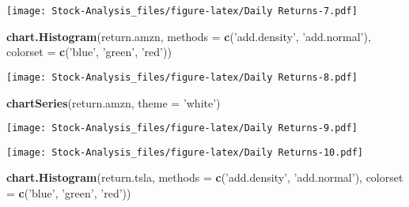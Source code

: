 \documentclass[
]{article}
\newenvironment{Shaded}{\begin{snugshade}}{\end{snugshade}}
\newcommand{\CommentTok}[1]{\textcolor[rgb]{0.56,0.35,0.01}{\textit{#1}}}
\newcommand{\DataTypeTok}[1]{\textcolor[rgb]{0.13,0.29,0.53}{#1}}
\newcommand{\DecValTok}[1]{\textcolor[rgb]{0.00,0.00,0.81}{#1}}
\newcommand{\KeywordTok}[1]{\textcolor[rgb]{0.13,0.29,0.53}{\textbf{#1}}}
\newcommand{\NormalTok}[1]{#1}
\newcommand{\OperatorTok}[1]{\textcolor[rgb]{0.81,0.36,0.00}{\textbf{#1}}}
\newcommand{\StringTok}[1]{\textcolor[rgb]{0.31,0.60,0.02}{#1}}
\begin{document}
\texttt{[image: Stock-Analysis\_files/figure-latex/Daily Returns-7.pdf]}

\begin{Shaded}
\begin{Highlighting}[]
\KeywordTok{chart.Histogram}\NormalTok{(return.amzn,}
                \DataTypeTok{methods =} \KeywordTok{c}\NormalTok{(}\StringTok{'add.density'}\NormalTok{, }\StringTok{'add.normal'}\NormalTok{),}
                \DataTypeTok{colorset =} \KeywordTok{c}\NormalTok{(}\StringTok{'blue'}\NormalTok{, }\StringTok{'green'}\NormalTok{, }\StringTok{'red'}\NormalTok{))}
\end{Highlighting}
\end{Shaded}

\texttt{[image: Stock-Analysis\_files/figure-latex/Daily Returns-8.pdf]}

\begin{Shaded}
\begin{Highlighting}[]
\KeywordTok{chartSeries}\NormalTok{(return.amzn, }\DataTypeTok{theme =} \StringTok{'white'}\NormalTok{)}
\end{Highlighting}
\end{Shaded}

\texttt{[image: Stock-Analysis\_files/figure-latex/Daily Returns-9.pdf]}

\begin{Shaded}
\end{Shaded}

\texttt{[image: Stock-Analysis\_files/figure-latex/Daily Returns-10.pdf]}

\begin{Shaded}
\begin{Highlighting}[]
\KeywordTok{chart.Histogram}\NormalTok{(return.tsla,}
                \DataTypeTok{methods =} \KeywordTok{c}\NormalTok{(}\StringTok{'add.density'}\NormalTok{, }\StringTok{'add.normal'}\NormalTok{),}
                \DataTypeTok{colorset =} \KeywordTok{c}\NormalTok{(}\StringTok{'blue'}\NormalTok{, }\StringTok{'green'}\NormalTok{, }\StringTok{'red'}\NormalTok{))}
\end{Highlighting}
\end{Shaded}
\end{document}
